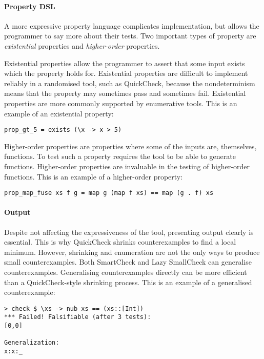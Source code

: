 \paragraph{Property DSL}
A more expressive property language complicates implementation, but
allows the programmer to say more about their tests.  Two important
types of property are \emph{existential} properties and
\emph{higher-order} properties.

Existential properties allow the programmer to assert that some input
exists which the property holds for.  Existential properties are
difficult to implement reliably in a randomised tool, such as
QuickCheck, because the nondeterminism means that the property may
sometimes pass and sometimes fail.  Existential properties are more
commonly supported by enumerative tools.  This is an example of an
existential property:

\begin{verbatim}
prop_gt_5 = exists (\x -> x > 5)
\end{verbatim}

Higher-order properties are properties where some of the inputs are,
themselves, functions.  To test such a property requires the tool to
be able to generate functions.  Higher-order properties are invaluable
in the testing of higher-order functions.  This is an example of a
higher-order property:

\begin{verbatim}
prop_map_fuse xs f g = map g (map f xs) == map (g . f) xs
\end{verbatim}

\paragraph{Output}
Despite not affecting the expressiveness of the tool, presenting
output clearly is essential.  This is why
QuickCheck\cite{claessen2000} shrinks counterexamples to find a local
minimum.  However, shrinking and enumeration are not the only ways to
produce small counterexamples.  Both SmartCheck\cite{pike2014} and
Lazy SmallCheck\cite{runciman2008} can generalise counter\-examples.
Generalising counterexamples directly can be more efficient than a
QuickCheck-style shrinking process\cite{pike2014}.  This is an example
of a generalised counterexample:

\begin{verbatim}
> check $ \xs -> nub xs == (xs::[Int])
*** Failed! Falsifiable (after 3 tests):
[0,0]

Generalization:
x:x:_
\end{verbatim}

